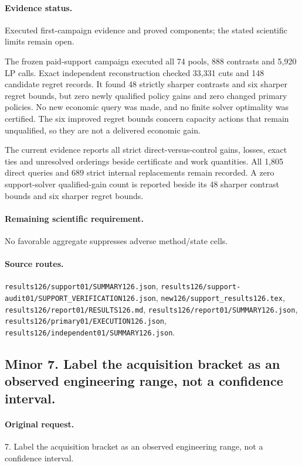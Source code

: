 \paragraph{Evidence status.} Executed first-campaign evidence and proved components; the stated scientific limits remain open.

The frozen paid-support campaign executed all 74 pools, 888 contrasts and 5,920 LP calls. Exact independent reconstruction checked 33,331 cuts and 148 candidate regret records. It found 48 strictly sharper contrasts and six sharper regret bounds, but zero newly qualified policy gains and zero changed primary policies. No new economic query was made, and no finite solver optimality was certified. The six improved regret bounds concern capacity actions that remain unqualified, so they are not a delivered economic gain.\par
The current evidence reports all strict direct-versus-control gains, losses, exact ties and unresolved orderings beside certificate and work quantities. All 1,805 direct queries and 689 strict internal replacements remain recorded. A zero support-solver qualified-gain count is reported beside its 48 sharper contrast bounds and six sharper regret bounds.\par

\paragraph{Remaining scientific requirement.} No favorable aggregate suppresses adverse method/state cells.

\paragraph{Source routes.} \nolinkurl{results126/support01/SUMMARY126.json}, \nolinkurl{results126/support-audit01/SUPPORT_VERIFICATION126.json}, \nolinkurl{new126/support_results126.tex}, \nolinkurl{results126/report01/RESULTS126.md}, \nolinkurl{results126/report01/SUMMARY126.json}, \nolinkurl{results126/primary01/EXECUTION126.json}, \nolinkurl{results126/independent01/SUMMARY126.json}.

\subsection*{Minor 7. Label the acquisition bracket as an observed engineering range, not a confidence interval.}
\paragraph{Original request.} 7. Label the acquisition bracket as an observed engineering range, not a confidence interval.

